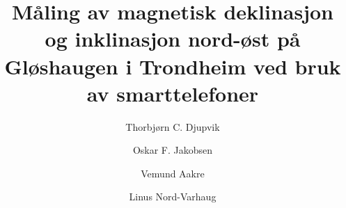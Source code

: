 
\title{Måling av magnetisk deklinasjon og inklinasjon nord-øst på Gløshaugen i Trondheim ved bruk av smarttelefoner}
\author[1]{Thorbjørn C. Djupvik}
\author[1]{Oskar F. Jakobsen}
\author[1]{Vemund Aakre}
\author[1]{Linus Nord-Varhaug}


\maketitle
